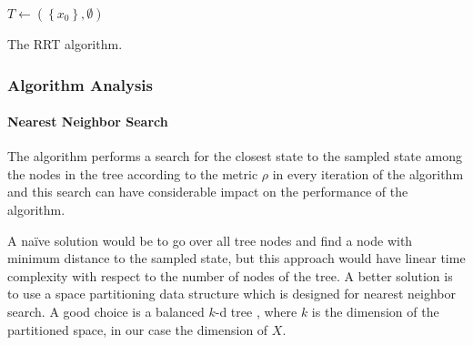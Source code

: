 \begin{algorithm}
	\SetAlgoLined
	\DontPrintSemicolon
	
	
	
	$T\gets \left(\left\{x_0\right\}, \emptyset\right)$\;
	
	
	\;
	
	\caption{The RRT algorithm.}
	\label{alg:rrt}
\end{algorithm}

\subsubsection{Algorithm Analysis}

\paragraph{Nearest Neighbor Search}

The algorithm performs a search for the closest state to the sampled state among the nodes in the tree according to the metric $\rho$ in every iteration of the algorithm and this search can have considerable impact on the performance of the algorithm.

A naïve solution would be to go over all tree nodes and find a node with minimum distance to the sampled state, but this approach would have linear time complexity with respect to the number of nodes of the tree. A better solution is to use a space partitioning data structure which is designed for nearest neighbor search. A good choice is a balanced $k$-d tree \cite{kd-tree}, where $k$ is the dimension of the partitioned space, in our case the dimension of $X$.

